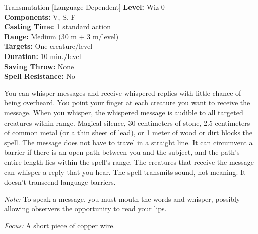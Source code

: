 {Transmutation [Language-Dependent]}
{
	\textbf{Level:}
	Wiz 0\\
	\textbf{Components:}
	V, S, F\\
	\textbf{Casting Time:}
	1 standard action\\
	\textbf{Range:}
	Medium (30 m + 3 m/level)\\
	\textbf{Targets:}
	One creature/level\\
	\textbf{Duration:}
	10 min./level\\
	\textbf{Saving Throw:}
	None\\
	\textbf{Spell Resistance:}
	No\\
}
{
	You can whisper messages and receive whispered replies with little chance of being overheard. You point your finger at each creature you want to receive the message. When you whisper, the whispered message is audible to all targeted creatures within range. Magical silence, 30 centimeters of stone, 2.5 centimeters of common metal (or a thin sheet of lead), or 1 meter of wood or dirt blocks the spell. The message does not have to travel in a straight line. It can circumvent a barrier if there is an open path between you and the subject, and the path's entire length lies within the spell's range. The creatures that receive the message can whisper a reply that you hear. The spell transmits sound, not meaning. It doesn't transcend language barriers.

	\textit{Note:} To speak a message, you must mouth the words and whisper, possibly allowing observers the opportunity to read your lips.

	\textit{Focus:}
	A short piece of copper wire.

}
